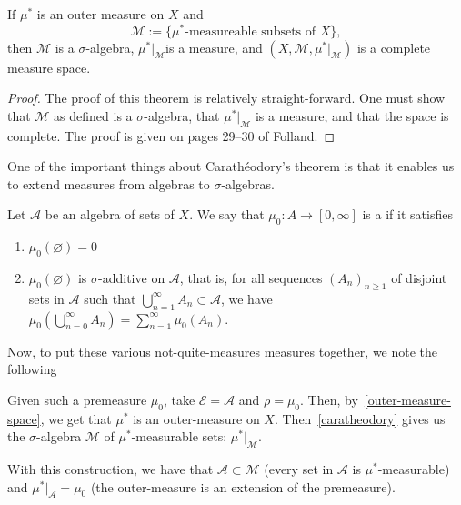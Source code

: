\documentclass[11pt,leqno,oneside]{amsbook}
\numberwithin{thm}{section}
\renewcommand{\A}{\mathcal{A}}
\newcommand{\M}{\mathcal{M}}
\newcommand{\Ep}{\mathcal{E}}
\renewcommand{\emptyset}{\varnothing}
\begin{document}
\begin{thm}[Carathéodory]\label{caratheodory}
  If $\mu^*$ is an outer measure on $X$ and \[
    \M := \{\mu^*\text{-measureable subsets of }X\},
  \]
  then $\M$ is a $\sigma$-algebra, $\mu^*|_\M$is a measure, and
  $(X,\M,\mu^*|_\M)$ is a complete measure space.
\end{thm}
\begin{proof}
  The proof of this theorem is relatively straight-forward. One must
  show that $\M$ as defined is a $\sigma$-algebra, that $\mu^*|_\M$ is
  a measure, and that the space is complete. The proof is given on
  pages 29--30 of Folland.
\end{proof}
One of the important things about Carathéodory's theorem is that it
enables us to extend measures from algebras to $\sigma$-algebras.
\begin{defn}
  Let $\A$ be an algebra of sets of $X$. We say that $\mu_0 \colon A \to
  [0,\infty]$ is a  if it satisfies
  \begin{enumerate}
  \item $\mu_0(\emptyset) = 0$
  \item $\mu_0(\emptyset)$ is $\sigma$-additive on $\A$, that is, for
    all sequences $(A_n)_{n \geq 1}$ of disjoint sets in $\A$ such
    that $\bigcup_{n=1}^\infty A_n \subset \A$, we have $\mu_0\left(
      \bigcup_{n=0}^\infty A_n \right) = \sum_{n=1}^\infty
    \mu_0(A_n)$.
  \end{enumerate}
\end{defn}
Now, to put these various not-quite-measures measures together, we
note the following
\begin{rmk}
  Given such a premeasure $\mu_0$, take $\Ep = \A$ and $\rho =
  \mu_0$. Then, by~\ref{outer-measure-space}, we get that $\mu^*$ is
  an outer-measure on $X$. Then~\ref{caratheodory} gives us the $\sigma$-algebra $\M$
  of $\mu^*$-measurable sets: $\mu^*|_\M$.
\end{rmk}
\begin{thm}\label{premeas-extension}
  With this construction, we have that $\A \subset \M$ (every set in $\A$ is $\mu^*$-measurable) and $\mu^*|_\A
  = \mu_0$ (the outer-measure is an extension of the premeasure).
\end{thm}
\end{document}
